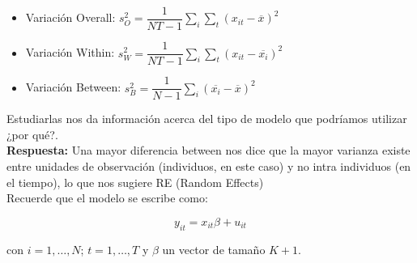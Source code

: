 \documentclass[11pt]{article}
\begin{document}
	\begin{itemize}
	\item Variación Overall: $s_O^2=\dfrac{1}{NT-1}\sum_i\sum_t(x_{it}-\overline{x})^2$
	\item Variación Within: $s_W^2=\dfrac{1}{NT-1}\sum_i\sum_t(x_{it}-\overline{x_i})^2$
	\item Variación Between: $s_B^2=\dfrac{1}{N-1}\sum_i(\overline{x_i}-\overline{x})^2$
	\end{itemize}
	
	
Estudiarlas nos da información acerca del tipo de modelo que podríamos utilizar ¿por qué?. \\

\textbf{Respuesta:} Una mayor diferencia between nos dice que la mayor varianza existe entre unidades de observación (individuos, en este caso) y no intra individuos (en el tiempo), lo que nos sugiere RE (Random Effects)\\

Recuerde que el modelo se escribe como:

$$y_{it}=x_{it}\beta+u_{it}$$

con $i=1,\ldots,N$; $t=1,\ldots,T$ y $\beta$ un vector de tamaño $K+1$.
\end{document}
